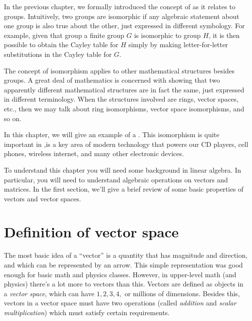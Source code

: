 
In the previous chapter, we formally introduced the concept of  as it relates to groups.
Intuitively, two groups are isomorphic if any algebraic statement about one group is also true about the other, just expressed in different symbology. For example, given that group a finite group $G$ is isomorphic to group $H$, it is then possible to obtain the Cayley table for $H$ simply by making letter-for-letter substitutions in the Cayley table for $G$.

The concept of isomorphism  applies to other mathematical structures besides groups. A great deal of mathematics is concerned with showing that two apparently different mathematical structures are in fact the same, just expressed in different terminology. When the structures involved are rings, vector spaces, etc., then we may talk about ring isomorphisms, vector space isomorphisms, and so on.

In this chapter, we will give an example of a . 
This isomorphism is quite important in  ,is a key area of modern technology that powers our CD players, cell phones, wireless internet, and many other electronic devices. 

To understand this chapter you will need some background in linear algebra. In particular, you will need to understand algebraic operations on vectors and matrices. In the first section, we'll give a brief review of some basic properties of vectors and vector spaces. 

\section{Definition of  vector space}
\label{sec:ExploringPolynomials:DefiningVectorSpace}
The most basic idea of a ``vector'' is  a quantity that has magnitude and direction, and which can be represented by an arrow. This simple representation was good enough for basic math and physics classes. However, in upper-level math (and physics) there's a lot more to vectors than this. Vectors are defined as objects in a \emph{vector space}, which can have $1,2,3, 4,$ or millions of dimensions. Besides this, vectors in a vector space must have two operations (called \emph{addition} and \emph{scalar multiplication}) which must satisfy certain requirements. 

